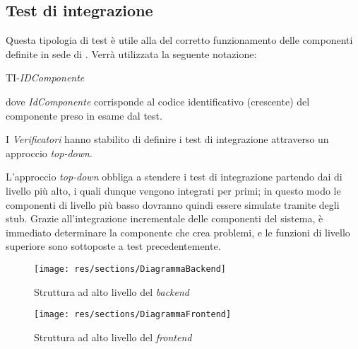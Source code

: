 \newpage
\subsection{Test di integrazione}
Questa tipologia di test è utile alla  del corretto funzionamento delle componenti definite in sede di \SpecificaTecnica.
Verrà utilizzata la seguente notazione:
	\begin{center}
		TI-\textit{IDComponente}
	\end{center}
dove \textit{IdComponente} corrisponde al codice identificativo (crescente) del componente preso in esame
dal test.

I \textit{Verificatori} hanno stabilito di definire i test di integrazione attraverso un approccio  \textit{top-down}. 


L'approccio \textit{top-down} obbliga a stendere i test di integrazione partendo dai 
di livello più alto, i quali dunque vengono integrati per primi;
in questo modo le componenti di livello più basso dovranno quindi essere simulate tramite degli
stub. Grazie all'integrazione incrementale delle componenti del sistema, è immediato determinare
la componente che crea problemi, e le funzioni di livello superiore sono sottoposte a test precedentemente.

\begin{figure}[H]
      \begin{center}
        \texttt{[image: res/sections/DiagrammaBackend]}
      \caption{Struttura ad alto livello del \textit{backend}}
      \end{center}
\end{figure}

\begin{figure}[H]

        \centering
        \texttt{[image: res/sections/DiagrammaFrontend]}
        \caption{Struttura ad alto livello del \textit{frontend}}
\end{figure}





